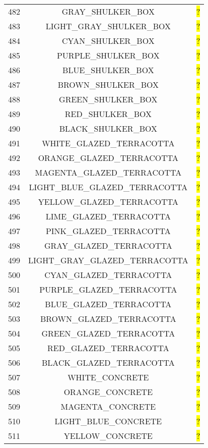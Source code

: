 \documentclass[11pt]{article}
\newcommand\myworries[1]{\sethlcolor{red}\hl{#1}}
\begin{document}
\begin{longtable}{ |c|c|c| }
482 & GRAY\_SHULKER\_BOX & \myworries{?} \\
483 & LIGHT\_GRAY\_SHULKER\_BOX & \myworries{?} \\
484 & CYAN\_SHULKER\_BOX & \myworries{?} \\
485 & PURPLE\_SHULKER\_BOX & \myworries{?} \\
486 & BLUE\_SHULKER\_BOX & \myworries{?} \\
487 & BROWN\_SHULKER\_BOX & \myworries{?} \\
488 & GREEN\_SHULKER\_BOX & \myworries{?} \\
489 & RED\_SHULKER\_BOX & \myworries{?} \\
490 & BLACK\_SHULKER\_BOX & \myworries{?} \\
491 & WHITE\_GLAZED\_TERRACOTTA & \myworries{?} \\
492 & ORANGE\_GLAZED\_TERRACOTTA & \myworries{?} \\
493 & MAGENTA\_GLAZED\_TERRACOTTA & \myworries{?} \\
494 & LIGHT\_BLUE\_GLAZED\_TERRACOTTA & \myworries{?} \\
495 & YELLOW\_GLAZED\_TERRACOTTA & \myworries{?} \\
496 & LIME\_GLAZED\_TERRACOTTA & \myworries{?} \\
497 & PINK\_GLAZED\_TERRACOTTA & \myworries{?} \\
498 & GRAY\_GLAZED\_TERRACOTTA & \myworries{?} \\
499 & LIGHT\_GRAY\_GLAZED\_TERRACOTTA & \myworries{?} \\
500 & CYAN\_GLAZED\_TERRACOTTA & \myworries{?} \\
501 & PURPLE\_GLAZED\_TERRACOTTA & \myworries{?} \\
502 & BLUE\_GLAZED\_TERRACOTTA & \myworries{?} \\
503 & BROWN\_GLAZED\_TERRACOTTA & \myworries{?} \\
504 & GREEN\_GLAZED\_TERRACOTTA & \myworries{?} \\
505 & RED\_GLAZED\_TERRACOTTA & \myworries{?} \\
506 & BLACK\_GLAZED\_TERRACOTTA & \myworries{?} \\
507 & WHITE\_CONCRETE & \myworries{?} \\
508 & ORANGE\_CONCRETE & \myworries{?} \\
509 & MAGENTA\_CONCRETE & \myworries{?} \\
510 & LIGHT\_BLUE\_CONCRETE & \myworries{?} \\
511 & YELLOW\_CONCRETE & \myworries{?} \\

\end{longtable}
\end{document}
